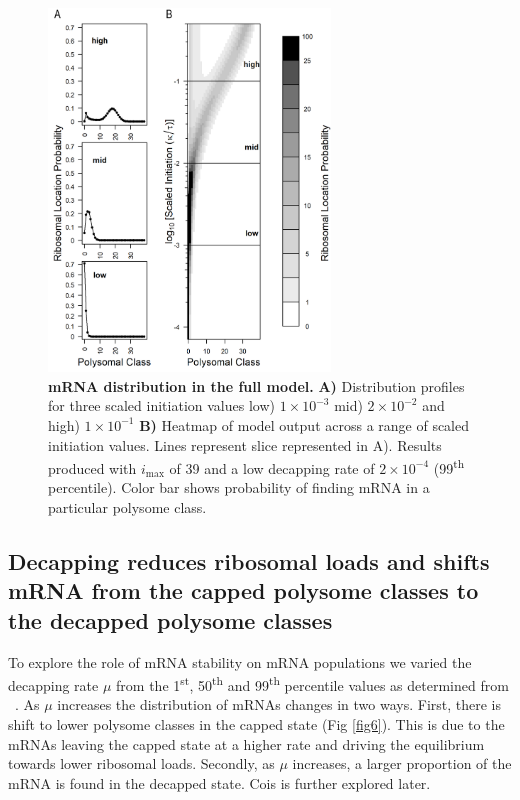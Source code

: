 \documentclass[10pt,letterpaper]{article}
\newcommand{\imax}{\ensuremath{{i_{\max}}}\xspace}
\begin{document}
\begin{figure}[!h]
  \begin{center}
    \includegraphics[width=75mm]{Images/2023-07-09_Figure1_DIIvsDDI_medianlength_low_marking_with_labels.png}
    \caption{{\bf mRNA distribution in the full model.} {\bf A)} Distribution profiles for three scaled initiation values low) $1\times 10^{-3}$ mid) $2\times 10^{-2}$ and high) $1\times 10^{-1}$ {\bf B)} Heatmap of model output across a range of scaled initiation values.
      Lines represent slice represented in A).
      Results produced with \imax of 39 and a low decapping rate of $2\times10^{-4}$  (99\textsuperscript{th} percentile).
      Color bar shows probability of finding mRNA in a particular polysome class.}
    \label{fig5}
  \end{center}
\end{figure}


\subsection*{Decapping reduces ribosomal loads and shifts mRNA from the capped polysome classes to the decapped polysome classes}

To explore the role of mRNA stability on mRNA populations we varied the decapping rate $\mu$ from the 1\textsuperscript{st}, 50\textsuperscript{th} and 99\textsuperscript{th} percentile values as determined from ~\cite{RN27}.
As $\mu$ increases the distribution of mRNAs changes in two ways. 
First, there is shift to lower polysome classes in the capped state (Fig \ref{fig6}).
This is due to the mRNAs leaving the capped state at a higher rate and driving the equilibrium towards lower ribosomal loads. 
Secondly, as $\mu$ increases, a larger proportion of the mRNA is found in the decapped state.
Cois is further explored later. 
\end{document}
